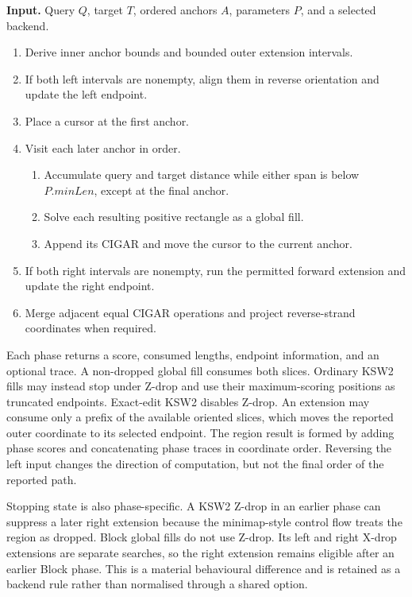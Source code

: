 \begin{algorithm}[htbp]
\caption{Final alignment of one chained region}
\label{alg:three-phase-alignment}
\begin{minipage}{\linewidth}
\small
\textbf{Input.} Query \(Q\), target \(T\), ordered anchors \(A\), parameters
\(P\), and a selected backend.
\begin{enumerate}
    \item Derive inner anchor bounds and bounded outer extension intervals.
    \item If both left intervals are nonempty, align them in reverse
          orientation and update the left endpoint.
    \item Place a cursor at the first anchor.
    \item Visit each later anchor in order.
    \begin{enumerate}
        \item Accumulate query and target distance while either span is below
              \(P.\mathit{minLen}\), except at the final anchor.
        \item Solve each resulting positive rectangle as a global fill.
        \item Append its CIGAR and move the cursor to the current anchor.
    \end{enumerate}
    \item If both right intervals are nonempty, run the permitted forward
          extension and update the right endpoint.
    \item Merge adjacent equal CIGAR operations and project reverse-strand
          coordinates when required.
\end{enumerate}
\end{minipage}
\end{algorithm}

Each phase returns a score, consumed lengths, endpoint information, and an
optional trace. A non-dropped global fill consumes both slices. Ordinary KSW2
fills may instead stop under Z-drop and use their maximum-scoring positions as
truncated endpoints. Exact-edit KSW2 disables Z-drop. An extension may consume
only a prefix of the available oriented slices, which moves the
reported outer coordinate to its selected endpoint. The region result is
formed by adding phase scores and concatenating phase traces in coordinate
order. Reversing the left input changes the direction of computation, but not
the final order of the reported path.

Stopping state is also phase-specific. A KSW2 Z-drop in an earlier phase can
suppress a later right extension because the minimap-style control flow treats
the region as dropped. Block global fills do not use Z-drop. Its left and
right X-drop extensions are separate searches, so the right extension remains
eligible after an earlier Block phase. This is a material behavioural
difference and is retained as a backend rule rather than normalised through a
shared option.

